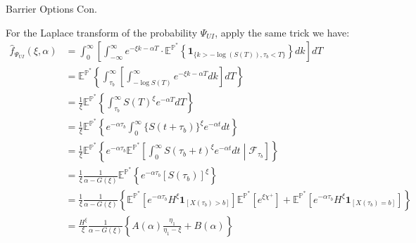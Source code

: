 \documentclass{beamer}
\begin{document}
\begin{frame}{Barrier Options Con.}

    {\footnotesize \scriptsize
    \par For the Laplace transform of the probability \(\Psi_{UI}\), apply the same trick we have: 
    \begin{align*}
        \hat{f}_{\Psi_{UI}}(\xi, \alpha) &= \int_0^\infty \left[ \int_{-\infty}^\infty e^{-\xi k - \alpha T} \cdot
         \mathbb{E}^{\mathbb{P}^*} \left\{ \mathbf{1}_{\{k > -\log(S(T)), \tau_b < T\}} \right\}  dk \right] dT\\
        &= \mathbb{E}^{\mathbb{P}^*} \left\{ \int_{\tau_b}^\infty \left[ \int_{-\log S(T)}^\infty e^{-\xi k - \alpha T}  dk \right] dT \right\}\\
        &= \frac{1}{\xi} \mathbb{E}^{\mathbb{P}^*} \left\{ \int_{\tau_b}^\infty S(T)^{\xi} e^{-\alpha T} dT \right\}\\
        &= \frac{1}{\xi} \mathbb{E}^{\mathbb{P}^*} \left\{ e^{-\alpha \tau_b} \int_0^\infty \{ S(t + \tau_b) \}^{\xi} e^{-\alpha t} dt \right\}\\
        &= \frac{1}{\xi} \mathbb{E}^{\mathbb{P}^*} \left\{ e^{-\alpha \tau_b} \mathbb{E}^{\mathbb{P}^*} \left[ \int_0^\infty S(\tau_b + t)^\xi e^{-\alpha t} 
         dt \middle| \mathcal{F}_{\tau_b} \right]\right\}\\
         & =\frac{1}{\xi} \frac{1}{\alpha - G(\xi)} \mathbb{E}^{\mathbb{P}^*} \left\{ e^{-\alpha \tau_b} [S(\tau_b)]^{\xi} \right\}\\
         & =  \frac{1}{\xi} \frac{1}{\alpha - G(\xi)} \left\{ \mathbb{E}^{\mathbb{P}^*} \left[ e^{-\alpha \tau_b} H^{\xi} \mathbf{1}_{[X(\tau_b) > b]} \right] \mathbb{E}^{\mathbb{P}^*} \left[ e^{\xi \chi^+} \right] 
         + \mathbb{E}^{\mathbb{P}^*} \left[ e^{-\alpha \tau_b} H^{\xi} \mathbf{1}_{[X(\tau_b) = b]} \right] \right\}\\
         &= \frac{H^{\xi}}{\xi} \frac{1}{\alpha - G(\xi)} \left\{ A(\alpha) \frac{\eta_1}{\eta_1 - \xi} + B(\alpha) \right\}
    \end{align*}
    }
\end{frame}



    
\end{document}
